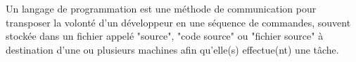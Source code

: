 \begin{frame}
  \frametitle{\secname}
  \framesubtitle{\subsecname}
  Un langage de programmation est une méthode de communication pour transposer la volonté d'un développeur
  en une séquence de commandes, souvent stockée dans un fichier appelé "source", "code source" ou "fichier source"
  à destination d'une ou plusieurs machines afin qu'elle(s) effectue(nt) une tâche.
\end{frame}
